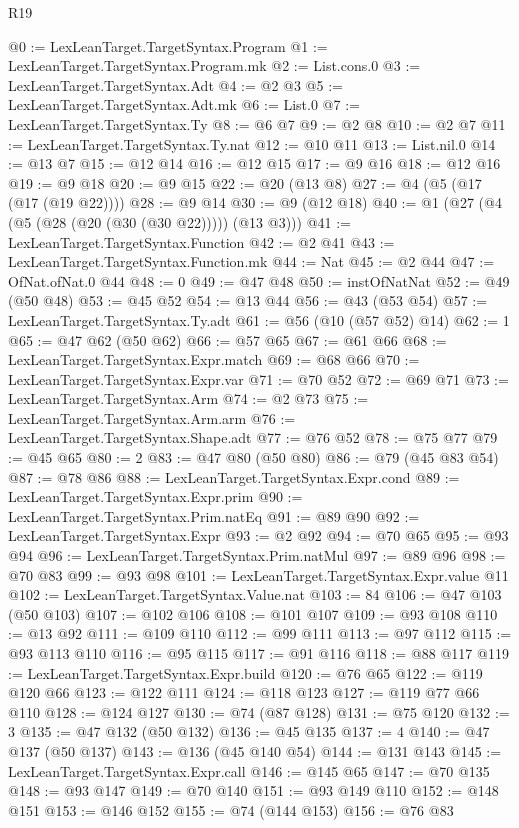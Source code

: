 \begin{lexlean}{R19}
\begin{coremodule}
@0 := LexLeanTarget.TargetSyntax.Program
@1 := LexLeanTarget.TargetSyntax.Program.mk
@2 := List.cons.{0}
@3 := LexLeanTarget.TargetSyntax.Adt
@4 := @2 @3
@5 := LexLeanTarget.TargetSyntax.Adt.mk
@6 := List.{0}
@7 := LexLeanTarget.TargetSyntax.Ty
@8 := @6 @7
@9 := @2 @8
@10 := @2 @7
@11 := LexLeanTarget.TargetSyntax.Ty.nat
@12 := @10 @11
@13 := List.nil.{0}
@14 := @13 @7
@15 := @12 @14
@16 := @12 @15
@17 := @9 @16
@18 := @12 @16
@19 := @9 @18
@20 := @9 @15
@22 := @20 (@13 @8)
@27 := @4 (@5 (@17 (@17 (@19 @22))))
@28 := @9 @14
@30 := @9 (@12 @18)
@40 := @1 (@27 (@4 (@5 (@28 (@20 (@30 (@30 @22))))) (@13 @3)))
@41 := LexLeanTarget.TargetSyntax.Function
@42 := @2 @41
@43 := LexLeanTarget.TargetSyntax.Function.mk
@44 := Nat
@45 := @2 @44
@47 := OfNat.ofNat.{0} @44
@48 := 0
@49 := @47 @48
@50 := instOfNatNat
@52 := @49 (@50 @48)
@53 := @45 @52
@54 := @13 @44
@56 := @43 (@53 @54)
@57 := LexLeanTarget.TargetSyntax.Ty.adt
@61 := @56 (@10 (@57 @52) @14)
@62 := 1
@65 := @47 @62 (@50 @62)
@66 := @57 @65
@67 := @61 @66
@68 := LexLeanTarget.TargetSyntax.Expr.match
@69 := @68 @66
@70 := LexLeanTarget.TargetSyntax.Expr.var
@71 := @70 @52
@72 := @69 @71
@73 := LexLeanTarget.TargetSyntax.Arm
@74 := @2 @73
@75 := LexLeanTarget.TargetSyntax.Arm.arm
@76 := LexLeanTarget.TargetSyntax.Shape.adt
@77 := @76 @52
@78 := @75 @77
@79 := @45 @65
@80 := 2
@83 := @47 @80 (@50 @80)
@86 := @79 (@45 @83 @54)
@87 := @78 @86
@88 := LexLeanTarget.TargetSyntax.Expr.cond
@89 := LexLeanTarget.TargetSyntax.Expr.prim
@90 := LexLeanTarget.TargetSyntax.Prim.natEq
@91 := @89 @90
@92 := LexLeanTarget.TargetSyntax.Expr
@93 := @2 @92
@94 := @70 @65
@95 := @93 @94
@96 := LexLeanTarget.TargetSyntax.Prim.natMul
@97 := @89 @96
@98 := @70 @83
@99 := @93 @98
@101 := LexLeanTarget.TargetSyntax.Expr.value @11
@102 := LexLeanTarget.TargetSyntax.Value.nat
@103 := 84
@106 := @47 @103 (@50 @103)
@107 := @102 @106
@108 := @101 @107
@109 := @93 @108
@110 := @13 @92
@111 := @109 @110
@112 := @99 @111
@113 := @97 @112
@115 := @93 @113 @110
@116 := @95 @115
@117 := @91 @116
@118 := @88 @117
@119 := LexLeanTarget.TargetSyntax.Expr.build
@120 := @76 @65
@122 := @119 @120 @66
@123 := @122 @111
@124 := @118 @123
@127 := @119 @77 @66 @110
@128 := @124 @127
@130 := @74 (@87 @128)
@131 := @75 @120
@132 := 3
@135 := @47 @132 (@50 @132)
@136 := @45 @135
@137 := 4
@140 := @47 @137 (@50 @137)
@143 := @136 (@45 @140 @54)
@144 := @131 @143
@145 := LexLeanTarget.TargetSyntax.Expr.call
@146 := @145 @65
@147 := @70 @135
@148 := @93 @147
@149 := @70 @140
@151 := @93 @149 @110
@152 := @148 @151
@153 := @146 @152
@155 := @74 (@144 @153)
@156 := @76 @83

\end{coremodule}
\end{lexlean}
